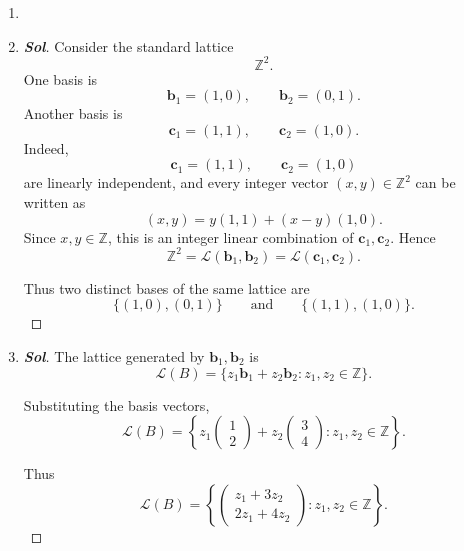 \begin{enumerate}
\begin{proof}[\normalfont\color{magenta}\bfseries Sol]
		\medskip
		\noindent
		Let
		\[
		V=\operatorname{span}_{\mathbb R}\{\mathbf{b}_1,\dots,\mathbf{b}_m\}.
		\]
		Since the vectors are linearly independent, the map
		\[
		T:\mathbb R^m\to V,\qquad
		T(z_1,\dots,z_m)=\sum_{i=1}^m z_i\mathbf{b}_i
		\]
		is a linear isomorphism. In particular, \(T(\mathbb Z^m)=\Lambda\).
		Because \(\mathbb Z^m\) is discrete in \(\mathbb R^m\), and \(T\) is a homeomorphism from \(\mathbb R^m\) onto \(V\), it follows that \(\Lambda\) is discrete in \(V\), hence also discrete in \(\mathbb R^n\).
		Therefore \(\Lambda\) is a discrete subgroup of \(\mathbb R^n\).
	\end{proof}
	\item[]
	\item 
	\begin{proof}[\normalfont\color{magenta}\bfseries Sol]
		Consider the standard lattice
		\[
		\mathbb Z^2.
		\]
		One basis is
		\[
		\mathbf b_1=(1,0),\qquad \mathbf b_2=(0,1).
		\]
		Another basis is
		\[
		\mathbf c_1=(1,1),\qquad \mathbf c_2=(1,0).
		\]
		Indeed,
		\[
		\mathbf c_1=(1,1),\qquad \mathbf c_2=(1,0)
		\]
		are linearly independent, and every integer vector \((x,y)\in\mathbb Z^2\) can be written as
		\[
		(x,y)=y(1,1)+(x-y)(1,0).
		\]
		Since \(x,y\in\mathbb Z\), this is an integer linear combination of \(\mathbf c_1,\mathbf c_2\). Hence
		\[
		\mathbb Z^2=\mathcal L(\mathbf b_1,\mathbf b_2)=\mathcal L(\mathbf c_1,\mathbf c_2).
		\]
		
		Thus two distinct bases of the same lattice are
		\[
		\boxed{
			\{(1,0),(0,1)\}
			\qquad\text{and}\qquad
			\{(1,1),(1,0)\}.
		}
		\]
	\end{proof}
	
	\newpage
	\item 
	\begin{proof}[\normalfont\color{magenta}\bfseries Sol]
		The lattice generated by \(\mathbf{b}_1,\mathbf{b}_2\) is
		\[
		\mathcal L(B)
		=
		\{z_1\mathbf{b}_1+z_2\mathbf{b}_2 : z_1,z_2\in\mathbb{Z}\}.
		\]
		
		Substituting the basis vectors,
		\[
		\mathcal L(B)
		=
		\left\{
		z_1
		\begin{pmatrix}
			1\\2
		\end{pmatrix}
		+
		z_2
		\begin{pmatrix}
			3\\4
		\end{pmatrix}
		: z_1,z_2\in\mathbb{Z}
		\right\}.
		\]
		
		Thus
		\[
		\mathcal L(B)
		=
		\left\{
		\begin{pmatrix}
			z_1+3z_2\\
			2z_1+4z_2
		\end{pmatrix}
		: z_1,z_2\in\mathbb{Z}
		\right\}.
		\]
		

\end{proof}
\end{enumerate}
